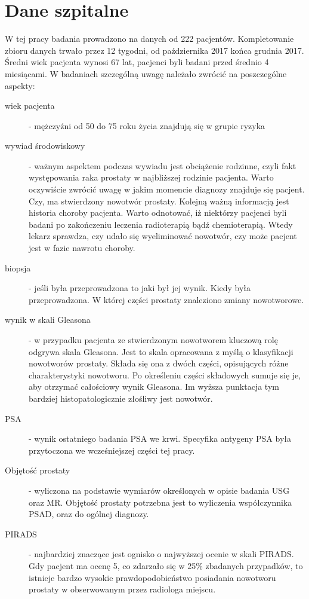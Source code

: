 \documentclass[a4paper,11pt,twoside]{report}
\theoremstyle{definition}
\begin{document}
\section{Dane szpitalne}
W tej pracy badania prowadzono na danych od 222 pacjentów. Kompletowanie zbioru danych trwało przez 12 tygodni, od października 2017 końca grudnia 2017. Średni wiek pacjenta wynosi 67 lat, pacjenci byli badani przed średnio 4 miesiącami.   
W badaniach szczególną uwagę należało zwrócić na poszczególne aspekty: \\
\begin{description}
\item[wiek pacjenta] - mężczyźni od 50 do 75 roku życia znajdują się w grupie ryzyka
\item[wywiad środowiskowy] - ważnym aspektem podczas wywiadu jest obciążenie rodzinne, czyli fakt występowania raka prostaty w najbliższej rodzinie pacjenta. Warto oczywiście zwrócić uwagę w jakim momencie diagnozy znajduje się pacjent. Czy, ma stwierdzony nowotwór prostaty. Kolejną ważną informacją jest historia choroby pacjenta. Warto odnotować, iż niektórzy pacjenci byli badani po zakończeniu leczenia radioterapią bądź chemioterapią. Wtedy lekarz sprawdza, czy udało się wyeliminować nowotwór, czy może pacjent jest w fazie nawrotu choroby.
\item[biopsja] - jeśli była przeprowadzona to jaki był jej wynik. Kiedy była przeprowadzona. W której części prostaty znaleziono zmiany nowotworowe.
\item[wynik w skali Gleasona \cite{gleason}] - w przypadku pacjenta ze stwierdzonym nowotworem kluczową rolę odgrywa skala Gleasona. Jest to skala opracowana z myślą o klasyfikacji nowotworów prostaty. Składa się ona z dwóch części, opisujących różne charakterystyki nowotworu. Po określeniu części składowych sumuje się je, aby otrzymać całościowy wynik Gleasona. Im wyższa punktacja tym bardziej histopatologicznie złośliwy jest nowotwór.
\item[PSA] - wynik ostatniego badania PSA we krwi. Specyfika antygeny PSA była przytoczona we wcześniejszej części tej pracy. 
\item[Objętość prostaty] - wyliczona na podstawie wymiarów określonych w opisie badania USG oraz MR. Objętość prostaty potrzebna jest to wyliczenia współczynnika PSAD, oraz do ogólnej diagnozy. 
\item[PIRADS] - najbardziej znaczące jest ognisko o najwyższej ocenie w skali PIRADS. Gdy pacjent ma ocenę 5, co zdarzało się w 25\% zbadanych przypadków, to istnieje bardzo wysokie prawdopodobieństwo posiadania nowotworu prostaty w obserwowanym przez radiologa miejscu. 

\end{description}
\end{document}
